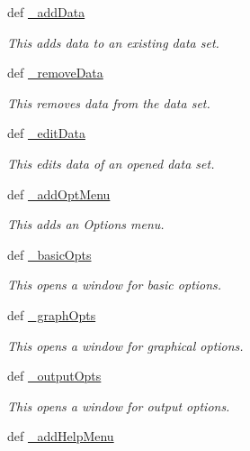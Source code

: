 \begin{DoxyCompactItemize}
def \hyperlink{classgui_1_1window2_1_1mainWindow_adce23e84928f330db51647c12cf18a22}{\-\_\-add\-Data}
\begin{DoxyCompactList}\small\item\em \-This adds data to an existing data set. \end{DoxyCompactList}\item 
def \hyperlink{classgui_1_1window2_1_1mainWindow_a64c00769449e39362a38721688554e33}{\-\_\-remove\-Data}
\begin{DoxyCompactList}\small\item\em \-This removes data from the data set. \end{DoxyCompactList}\item 
def \hyperlink{classgui_1_1window2_1_1mainWindow_a04fc4444b5b361369b1bc1d4d6ad5f77}{\-\_\-edit\-Data}
\begin{DoxyCompactList}\small\item\em \-This edits data of an opened data set. \end{DoxyCompactList}\item 
\hypertarget{classgui_1_1window2_1_1mainWindow_a0f158fe2e69dc8e906ea1e93df4397fe}{def \hyperlink{classgui_1_1window2_1_1mainWindow_a0f158fe2e69dc8e906ea1e93df4397fe}{\-\_\-add\-Opt\-Menu}}\label{classgui_1_1window2_1_1mainWindow_a0f158fe2e69dc8e906ea1e93df4397fe}

\begin{DoxyCompactList}\small\item\em \-This adds an \-Options menu. \end{DoxyCompactList}\item 
def \hyperlink{classgui_1_1window2_1_1mainWindow_a6f03f407dd1c49e85437af18b46df69a}{\-\_\-basic\-Opts}
\begin{DoxyCompactList}\small\item\em \-This opens a window for basic options. \end{DoxyCompactList}\item 
def \hyperlink{classgui_1_1window2_1_1mainWindow_a145120f6dbe3e701fd55520b2cad767c}{\-\_\-graph\-Opts}
\begin{DoxyCompactList}\small\item\em \-This opens a window for graphical options. \end{DoxyCompactList}\item 
def \hyperlink{classgui_1_1window2_1_1mainWindow_a3e593c0bc9bef8082dc3d9e90498ae10}{\-\_\-output\-Opts}
\begin{DoxyCompactList}\small\item\em \-This opens a window for output options. \end{DoxyCompactList}\item 
\hypertarget{classgui_1_1window2_1_1mainWindow_a67ef40998197523b8ce51ec49aa57b94}{def \hyperlink{classgui_1_1window2_1_1mainWindow_a67ef40998197523b8ce51ec49aa57b94}{\-\_\-add\-Help\-Menu}}\label{classgui_1_1window2_1_1mainWindow_a67ef40998197523b8ce51ec49aa57b94}


\end{DoxyCompactItemize}
